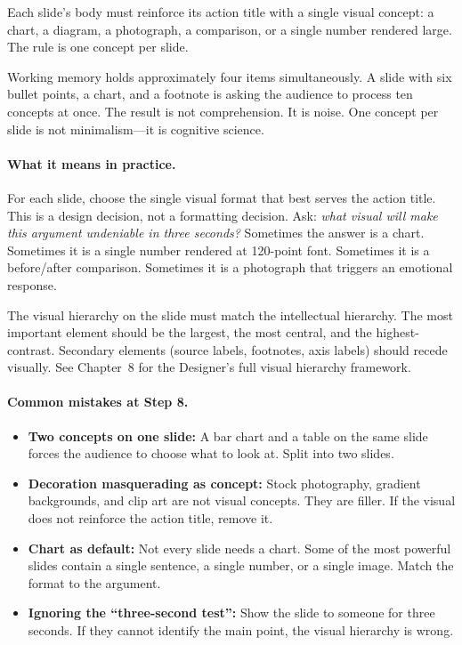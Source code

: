 Each slide's body must reinforce its action title with a single visual concept: a chart, a diagram, a photograph, a comparison, or a single number rendered large. The rule is one concept per slide.

\begin{alertbox}
Working memory holds approximately four items simultaneously. A slide with six bullet points, a chart, and a footnote is asking the audience to process ten concepts at once. The result is not comprehension. It is noise. One concept per slide is not minimalism---it is cognitive science.
\end{alertbox}

\paragraph{What it means in practice.} For each slide, choose the single visual format that best serves the action title. This is a design decision, not a formatting decision. Ask: \emph{what visual will make this argument undeniable in three seconds?} Sometimes the answer is a chart. Sometimes it is a single number rendered at 120-point font. Sometimes it is a before/after comparison. Sometimes it is a photograph that triggers an emotional response.

The visual hierarchy on the slide must match the intellectual hierarchy. The most important element should be the largest, the most central, and the highest-contrast. Secondary elements (source labels, footnotes, axis labels) should recede visually. See Chapter~8 for the Designer's full visual hierarchy framework.

\paragraph{Common mistakes at Step 8.}
\begin{itemize}
  \item \textbf{Two concepts on one slide:} A bar chart and a table on the same slide forces the audience to choose what to look at. Split into two slides.
  \item \textbf{Decoration masquerading as concept:} Stock photography, gradient backgrounds, and clip art are not visual concepts. They are filler. If the visual does not reinforce the action title, remove it.
  \item \textbf{Chart as default:} Not every slide needs a chart. Some of the most powerful slides contain a single sentence, a single number, or a single image. Match the format to the argument.
  \item \textbf{Ignoring the ``three-second test'':} Show the slide to someone for three seconds. If they cannot identify the main point, the visual hierarchy is wrong.
\end{itemize}


